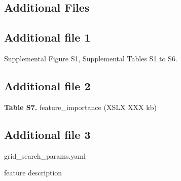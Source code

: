 \documentclass{bmcart}
\begin{document}
\begin{backmatter}
\section*{Additional Files}
  \subsection*{Additional file 1} \label{add:figs_tbls}
    Supplemental Figure S1, Supplemental Tables S1 to S6.
   
  \subsection*{Additional file 2}  \label{add:feature importance}
  \textbf{Table S7.} feature\_importance (XSLX XXX kb)

 \subsection*{Additional file 3}  \label{add:hyperoptparams}
   grid\_search\_params.yaml


feature description


\end{backmatter}
\end{document}
